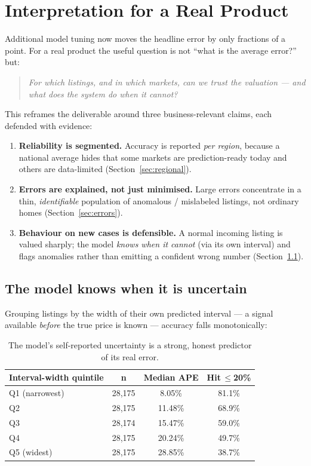 \documentclass[11pt]{article}
\newcommand{\pct}{\%}
\begin{document}
\section{Interpretation for a Real Product}
Additional model tuning now moves the headline error by only fractions of a point. For a real
product the useful question is not ``what is the average error?'' but:
\begin{quote}
\emph{For which listings, and in which markets, can we trust the valuation --- and what does the
system do when it cannot?}
\end{quote}
This reframes the deliverable around three business-relevant claims, each defended with evidence:
\begin{enumerate}
  \item \textbf{Reliability is segmented.} Accuracy is reported \emph{per region}, because a national
        average hides that some markets are prediction-ready today and others are data-limited
        (Section~\ref{sec:regional}).
  \item \textbf{Errors are explained, not just minimised.} Large errors concentrate in a thin,
        \emph{identifiable} population of anomalous / mislabeled listings, not ordinary homes
        (Section~\ref{sec:errors}).
  \item \textbf{Behaviour on new cases is defensible.} A normal incoming listing is valued sharply;
        the model \emph{knows when it cannot} (via its own interval) and flags anomalies rather than
        emitting a confident wrong number (Section~\ref{sec:defense}).
\end{enumerate}

\subsection{The model knows when it is uncertain}\label{sec:defense}
Grouping listings by the width of their own predicted interval --- a signal available \emph{before}
the true price is known --- accuracy falls monotonically:

\begin{table}[h]
\centering
\begin{tabular}{lccc}
\toprule
\textbf{Interval-width quintile} & \textbf{n} & \textbf{Median APE} & \textbf{Hit\,$\leq$20\pct} \\
\midrule
Q1 (narrowest) & 28,175 & 8.05\pct  & 81.1\pct \\
Q2             & 28,175 & 11.48\pct & 68.9\pct \\
Q3             & 28,174 & 15.47\pct & 59.0\pct \\
Q4             & 28,175 & 20.24\pct & 49.7\pct \\
Q5 (widest)    & 28,175 & 28.85\pct & 38.7\pct \\
\bottomrule
\end{tabular}
\caption{The model's self-reported uncertainty is a strong, honest predictor of its real error.}
\end{table}
\end{document}
